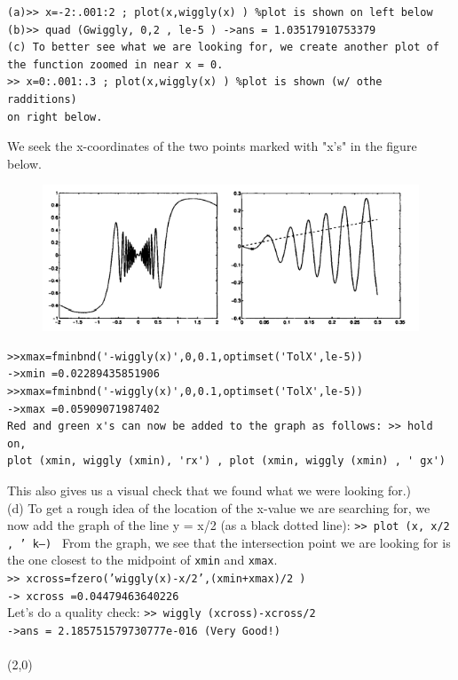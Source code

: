 \documentclass[../main.tex]{subfiles}
\begin{document}
\begin{lstlisting}[numbers=none,frame=none]
(a)>> x=-2:.001:2 ; plot(x,wiggly(x) ) %plot is shown on left below 
(b)>> quad (Gwiggly, 0,2 , le-5 ) ->ans = 1.03517910753379 
(c) To better see what we are looking for, we create another plot of the function zoomed in near x = 0. 
>> x=0:.001:.3 ; plot(x,wiggly(x) ) %plot is shown (w/ othe radditions) 
on right below. 
\end{lstlisting}
We seek the x-coordinates of the two points marked with "x's" in the figure below.
\begin{figure}[H]
\includegraphics[width=0.9\linewidth]{41}
	\centering
	\label{pfig:ch13_41}
\end{figure}
\begin{lstlisting}[numbers=none,frame=none]
>>xmax=fminbnd('-wiggly(x)',0,0.1,optimset('TolX',le-5))
->xmin =0.02289435851906 
>>xmax=fminbnd('-wiggly(x)',0,0.1,optimset('TolX',le-5)) 
->xmax =0.05909071987402 
Red and green x's can now be added to the graph as follows: >> hold on, 
plot (xmin, wiggly (xmin), 'rx') , plot (xmin, wiggly (xmin) , ' gx')
\end{lstlisting}
This also gives us a visual check that we found what we were looking for.) \\
(d) To get a rough idea of the location of the x-value we are searching for, we now add the graph of the 
line y = x/2 (as a black dotted line): \texttt{>> plot (x, x/2 , ' k--) } From the graph, we see that the 
intersection point we are looking for is the one closest to the midpoint of \texttt{xmin} and \texttt{xmax}.\\
\texttt{>> xcross=fzero('wiggly(x)-x/2',(xmin+xmax)/2 ) }\\
\texttt{-> xcross =0.04479463640226 }\\
Let's do a quality check: \texttt{>> wiggly (xcross)-xcross/2}
\\
\texttt{->ans = 2.185751579730777e-016 (Very Good!) }
\\
\\
\line(2,0){\textwidth}\\
\end{document}
